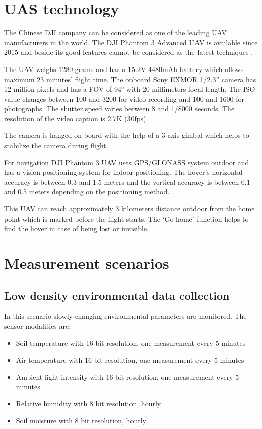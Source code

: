 \documentclass[conference]{IEEEtran}
\begin{document}
\section{UAS technology}

The Chinese DJI company can be considered as one of the leading UAV
manufacturers in the world. The DJI Phantom 3 Advanced UAV is available since
2015 and beside its good features cannot be considered as the latest techniques
\cite{udvardy2019}.

The UAV weighs 1280 grams and has a 15.2V 4480mAh battery which allows maximum
23 minutes’ flight time. The onboard Sony EXMOR 1/2.3” camera has 12 million
pixels and has a FOV of 94° with 20 millimeters focal length. The ISO value
changes between 100 and 3200 for video recording and 100 and 1600 for
photographs. The shutter speed varies between 8 and 1/8000 seconds. The
resolution of the video caption is 2.7K (30fps).

The camera is hanged on-board with the help of a 3-axis gimbal which helps to
stabilize the camera during flight. 

For navigation DJI Phantom 3 UAV uses GPS/GLONASS system outdoor and has a
vision positioning system for indoor positioning. The hover’s horizontal
accuracy is between 0.3 and 1.5 meters and the vertical accuracy is between 0.1
and 0.5 meters depending on the positioning method.

This UAV can reach approximately 3 kilometers distance outdoor from the home
point which is marked before the flight starts. The ‘Go home’ function helps to
find the hover in case of being lost or invisible.

\section{Measurement scenarios}

\subsection{Low density environmental data collection}

In this scenario slowly changing environmental parameters are monitored. The sensor modalities are:

\begin{itemize}

  \item{Soil temperature with 16 bit resolution, one measurement every 5 minutes}
  \item{Air temperature with 16 bit resolution, one measurement every 5 minutes}
  \item{Ambient light intensity with 16 bit resolution, one measurement every 5 minutes}
  \item{Relative humidity with 8 bit resolution, hourly}
  \item{Soil moisture with 8 bit resolution, hourly}

\end{itemize}
\end{document}

